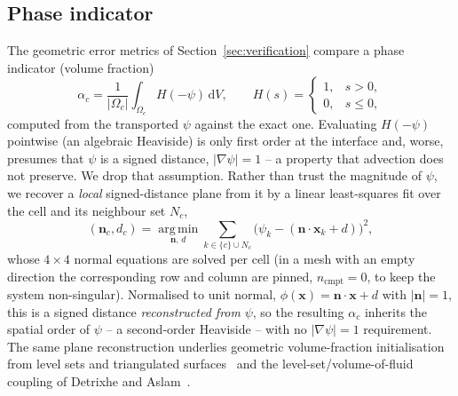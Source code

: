 \documentclass[preprint,3p,11pt]{elsarticle}
\newcommand{\psilev}{\psi}                       %
\newcommand{\gradpsi}{\lvert\nabla\psilev\rvert}
\begin{document}
\subsection{Phase indicator}
\label{sec:indicator}
The geometric error metrics of Section~\ref{sec:verification} compare a phase indicator
(volume fraction)
\begin{equation}
  \alpha_c = \frac{1}{|\Omega_c|}\int_{\Omega_c} H(-\psilev)\,\mathrm{d}V,
  \qquad H(s)=\begin{cases}1, & s>0,\\ 0, & s\le 0,\end{cases}
  \label{eq:alpha}
\end{equation}
computed from the transported $\psilev$ against the exact one. Evaluating $H(-\psilev)$
pointwise (an algebraic Heaviside) is only first order at the interface and, worse,
presumes that $\psilev$ is a signed distance, $\gradpsi=1$ -- a property that advection
does not preserve. We drop that assumption. Rather than trust the magnitude of
$\psilev$, we recover a \emph{local} signed-distance plane from it by a linear
least-squares fit over the cell and its neighbour set $N_c$,
\begin{equation}
  (\mathbf{n}_c,d_c) = \operatorname*{arg\,min}_{\mathbf{n},\,d}
     \sum_{k\in\{c\}\cup N_c}\!\bigl(\psilev_k-(\mathbf{n}\cdot\mathbf{x}_k+d)\bigr)^2,
  \label{eq:planefit}
\end{equation}
whose $4\times4$ normal equations are solved per cell (in a mesh with an empty direction
the corresponding row and column are pinned, $n_{\text{cmpt}}=0$, to keep the system
non-singular). Normalised to unit normal, $\phi(\mathbf{x})=\mathbf{n}\cdot\mathbf{x}+d$
with $|\mathbf{n}|=1$, this is a signed distance \emph{reconstructed from} $\psilev$, so
the resulting $\alpha_c$ inherits the spatial order of $\psilev$ -- a second-order
Heaviside -- with no $\gradpsi=1$ requirement. The same plane reconstruction underlies
geometric volume-fraction initialisation from level sets and triangulated
surfaces~\cite{maric2015lent,tolle2022trisurface} and the level-set/volume-of-fluid
coupling of Detrixhe and Aslam~\cite{detrixhe2016}.
\end{document}
